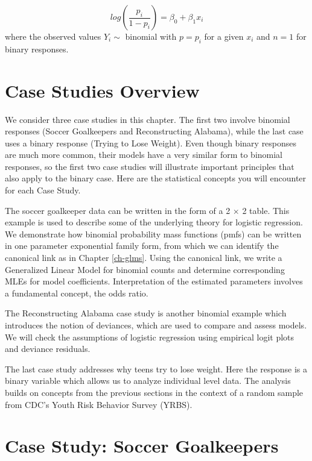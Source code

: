 \documentclass[
]{krantz}
\begin{document}
\begin{equation}
log(\frac{p_i}{1-p_i})=\beta_0+\beta_1 x_i
\label{eq:logisticReg}
\end{equation}
where the observed values \(Y_i \sim\) binomial with \(p=p_i\) for a given \(x_i\) and \(n=1\) for binary responses.

\hypertarget{case-studies-overview-1}{%
\section{Case Studies Overview}\label{case-studies-overview-1}}

We consider three case studies in this chapter. The first two involve binomial responses (Soccer Goalkeepers and Reconstructing Alabama), while the last case uses a binary response (Trying to Lose Weight). Even though binary responses are much more common, their models have a very similar form to binomial responses, so the first two case studies will illustrate important principles that also apply to the binary case. Here are the statistical concepts you will encounter for each Case Study.

The soccer goalkeeper data can be written in the form of a 2 \(\times\) 2 table. This example is used to describe some of the underlying theory for logistic regression. We demonstrate how binomial probability mass functions (pmfs) can be written in one parameter exponential family form, from which we can identify the canonical link as in Chapter \ref{ch-glms}. Using the canonical link, we write a Generalized Linear Model for binomial counts and determine corresponding MLEs for model coefficients. Interpretation of the estimated parameters involves a fundamental concept, the odds ratio.

The Reconstructing Alabama case study is another binomial example which introduces the notion of deviances, which are used to compare and assess models. We will check the assumptions of logistic regression using empirical logit plots and deviance residuals.

The last case study addresses why teens try to lose weight. Here the response is a binary variable which allows us to analyze individual level data. The analysis builds on concepts from the previous sections in the context of a random sample from CDC's Youth Risk Behavior Survey (YRBS).

\hypertarget{case-study-soccer-goalkeepers}{%
\section{Case Study: Soccer Goalkeepers}\label{case-study-soccer-goalkeepers}}
\end{document}
